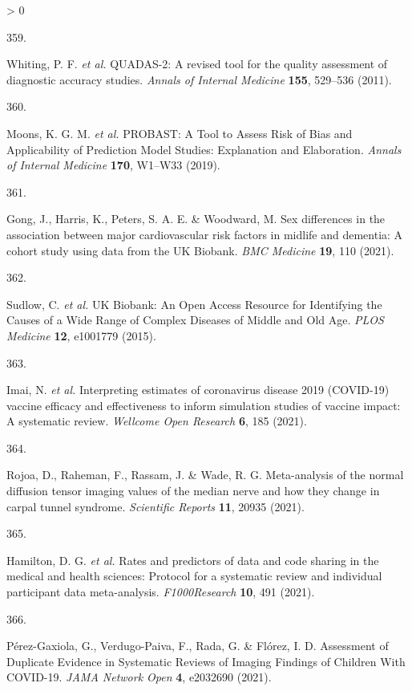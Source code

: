 \documentclass[a4paper, twoside]{templates/ociamthesis}
\newlength{\cslhangindent}
\newlength{\csllabelwidth}
\newenvironment{CSLReferences}[3] %
 {%
  \setlength{\parindent}{0pt}
  \ifodd #1 \everypar{\setlength{\hangindent}{\cslhangindent}}\ignorespaces\fi
  \ifnum #2 > 0
  \setlength{\parskip}{#2\baselineskip}
  \fi
 }%
 {}
\newcommand{\CSLLeftMargin}[1]{\parbox[t]{\maxof{\widthof{#1}}{\csllabelwidth}}{#1}}
\newcommand{\CSLRightInline}[1]{\parbox[t]{\linewidth - \csllabelwidth}{#1}}
\begin{document}
\begin{CSLReferences}{0}{0}
\leavevmode\hypertarget{ref-whiting2011}{}%
\CSLLeftMargin{359. }
\CSLRightInline{Whiting, P. F. \emph{et al.} {QUADAS}-2: A revised tool for the quality assessment of diagnostic accuracy studies. \emph{Annals of Internal Medicine} \textbf{155}, 529--536 (2011).}

\leavevmode\hypertarget{ref-moons2019}{}%
\CSLLeftMargin{360. }
\CSLRightInline{Moons, K. G. M. \emph{et al.} {PROBAST}: A {Tool} to {Assess Risk} of {Bias} and {Applicability} of {Prediction Model Studies}: Explanation and {Elaboration}. \emph{Annals of Internal Medicine} \textbf{170}, W1--W33 (2019).}

\leavevmode\hypertarget{ref-gong2021}{}%
\CSLLeftMargin{361. }
\CSLRightInline{Gong, J., Harris, K., Peters, S. A. E. \& Woodward, M. Sex differences in the association between major cardiovascular risk factors in midlife and dementia: A cohort study using data from the {UK Biobank}. \emph{BMC Medicine} \textbf{19}, 110 (2021).}

\leavevmode\hypertarget{ref-sudlow2015}{}%
\CSLLeftMargin{362. }
\CSLRightInline{Sudlow, C. \emph{et al.} {UK Biobank}: An {Open Access Resource} for {Identifying} the {Causes} of a {Wide Range} of {Complex Diseases} of {Middle} and {Old Age}. \emph{PLOS Medicine} \textbf{12}, e1001779 (2015).}

\leavevmode\hypertarget{ref-imai2021}{}%
\CSLLeftMargin{363. }
\CSLRightInline{Imai, N. \emph{et al.} Interpreting estimates of coronavirus disease 2019 ({COVID}-19) vaccine efficacy and effectiveness to inform simulation studies of vaccine impact: A systematic review. \emph{Wellcome Open Research} \textbf{6}, 185 (2021).}

\leavevmode\hypertarget{ref-rojoa2021}{}%
\CSLLeftMargin{364. }
\CSLRightInline{Rojoa, D., Raheman, F., Rassam, J. \& Wade, R. G. Meta-analysis of the normal diffusion tensor imaging values of the median nerve and how they change in carpal tunnel syndrome. \emph{Scientific Reports} \textbf{11}, 20935 (2021).}

\leavevmode\hypertarget{ref-hamilton2021}{}%
\CSLLeftMargin{365. }
\CSLRightInline{Hamilton, D. G. \emph{et al.} Rates and predictors of data and code sharing in the medical and health sciences: Protocol for a systematic review and individual participant data meta-analysis. \emph{F1000Research} \textbf{10}, 491 (2021).}

\leavevmode\hypertarget{ref-perez-gaxiola2021}{}%
\CSLLeftMargin{366. }
\CSLRightInline{Pérez-Gaxiola, G., Verdugo-Paiva, F., Rada, G. \& Flórez, I. D. Assessment of {Duplicate Evidence} in {Systematic Reviews} of {Imaging Findings} of {Children With COVID}-19. \emph{JAMA Network Open} \textbf{4}, e2032690 (2021).}


\end{CSLReferences}
\end{document}
